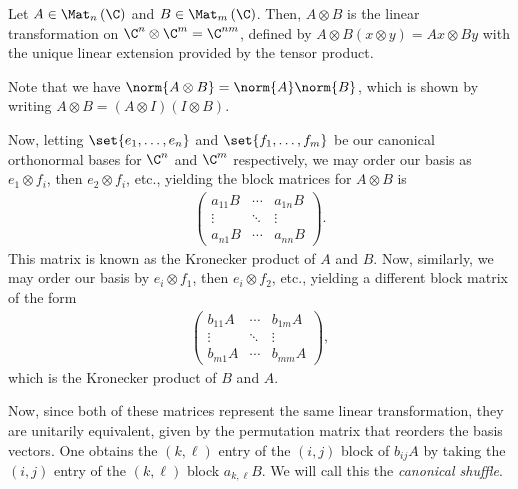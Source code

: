 \documentclass[10pt]{mypackage}
\begin{document}
Let $A\in \Mat_n\left( \C \right)$ and $B\in \Mat_m\left( \C \right)$. Then, $A\otimes B$ is the linear transformation on $\C^n\otimes \C^m = \C^{nm}$, defined by $A\otimes B\left( x\otimes y \right) = Ax\otimes By$ with the unique linear extension provided by the tensor product.\newline

Note that we have $\norm{A\otimes B} = \norm{A}\norm{B}$, which is shown by writing $A\otimes B = \left( A\otimes I \right)\left( I\otimes B \right)$.\newline

Now, letting $\set{e_1,\dots,e_n}$ and $\set{f_1,\dots,f_m}$ be our canonical orthonormal bases for $\C^n$ and $\C^m$ respectively, we may order our basis as $e_1\otimes f_i$, then $e_2\otimes f_i$, etc., yielding the block matrices for $A\otimes B$ is
\begin{align*}
  \begin{pmatrix}a_{11}B & \cdots & a_{1n}B \\ \vdots & \ddots & \vdots \\ a_{n1}B &\cdots & a_{nn}B\end{pmatrix}.
\end{align*}
This matrix is known as the Kronecker product of $A$ and $B$. Now, similarly, we may order our basis by $e_i\otimes f_1$, then $e_i\otimes f_2$, etc., yielding a different block matrix of the form
\begin{align*}
  \begin{pmatrix}b_{11}A &\cdots & b_{1m}A \\ \vdots & \ddots & \vdots \\ b_{m1}A & \cdots & b_{mm} A\end{pmatrix},
\end{align*}
which is the Kronecker product of $B$ and $A$.\newline

Now, since both of these matrices represent the same linear transformation, they are unitarily equivalent, given by the permutation matrix that reorders the basis vectors. One obtains the $(k,\ell)$ entry of the $(i,j)$ block of $b_{ij}A$ by taking the $(i,j)$ entry of the $(k,\ell)$ block $a_{k,\ell}B$. We will call this the \textit{canonical shuffle}.\newline
\end{document}
